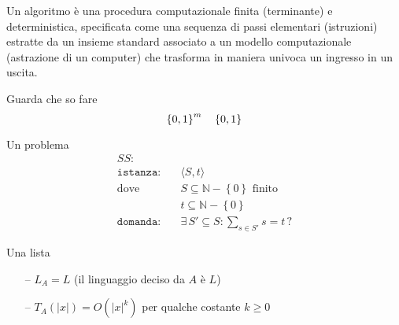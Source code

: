 \begin{definition}[Algoritmo]\label{def:algex}
    Un algoritmo è una procedura computazionale finita (terminante) e deterministica, specificata come una sequenza di passi elementari (istruzioni) estratte da un insieme standard associato a un modello computazionale (astrazione di un computer) che trasforma in maniera univoca un ingresso in un uscita.
\end{definition}

Guarda che so fare
\begin{equation*}
    \left\{0,1\right\}^{m}
    \quad
    \left\{0,1\right\}^{}
\end{equation*}

Un problema
\begin{align*}
    SS: & \\
    \texttt{istanza:} \quad & \langle S,t \rangle \\
    \text{dove} \quad & S \subseteq \mathbb{N} - \left\{ 0 \right\} \text{ finito} \\
    & t \subseteq \mathbb{N} - \left\{ 0 \right\} \\
    \texttt{domanda:} \quad & \exists \, S' \subseteq S : \sum_{s \in S'}^{} s = t \, ?
\end{align*}

Una lista
\begin{itemize}[noitemsep,parsep=0pt,partopsep=0pt,topsep=0pt]
    \item[--] $L_A = L$ (il linguaggio deciso da $A$ è $L$)
    \item[--] $T_A(|x|) = O(|x|^k)$ per qualche costante $k \geq 0$
\end{itemize}
